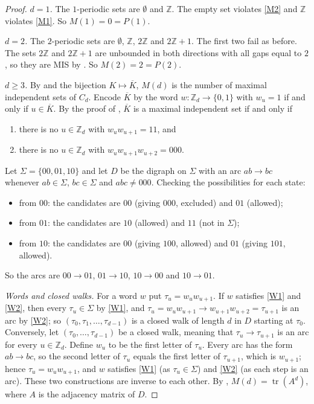 \documentclass[11pt]{article}
\theoremstyle{plain}
\theoremstyle{definition}
\theoremstyle{remark}
\newcommand{\Z}{\mathbb{Z}}
\newcommand{\Per}{P}
\DeclareMathOperator{\tr}{tr}
\begin{document}
\begin{proof}
\emph{$d = 1$.} The $1$-periodic sets are $\emptyset$ and $\Z$. The empty set violates
\ref{M2} and $\Z$ violates \ref{M1}. So $M(1) = 0 = \Per(1)$.

\emph{$d = 2$.} The $2$-periodic sets are $\emptyset$, $\Z$, $2\Z$ and $2\Z + 1$. The first
two fail as before. The sets $2\Z$ and $2\Z+1$ are unbounded in both directions with all gaps
equal to $2$, so they are MIS by . So $M(2) = 2 = \Per(2)$.

\emph{$d \ge 3$.} By  and the bijection $K \mapsto \overline{K}$,
$M(d)$ is the number of maximal independent sets of $C_d$. Encode $\overline{K}$ by the word
$w : \Z_d \to \{0,1\}$ with $w_u = 1$ if and only if $u \in \overline{K}$. By the proof of
, $\overline{K}$ is a maximal independent set if and only if
\begin{enumerate}[label=(W\arabic*)]
  \item\label{W1} there is no $u \in \Z_d$ with $w_u w_{u+1} = 11$, and
  \item\label{W2} there is no $u \in \Z_d$ with $w_u w_{u+1} w_{u+2} = 000$.
\end{enumerate}
Let $\Sigma = \{00, 01, 10\}$ and let $D$ be the digraph on $\Sigma$ with an arc
$ab \to bc$ whenever $ab \in \Sigma$, $bc \in \Sigma$ and $abc \ne 000$. Checking the
possibilities for each state:
\begin{itemize}
  \item from $00$: the candidates are $00$ (giving $000$, excluded) and $01$ (allowed);
  \item from $01$: the candidates are $10$ (allowed) and $11$ (not in $\Sigma$);
  \item from $10$: the candidates are $00$ (giving $100$, allowed) and $01$ (giving $101$,
        allowed).
\end{itemize}
So the arcs are $00 \to 01$, $01 \to 10$, $10 \to 00$ and $10 \to 01$.

\emph{Words and closed walks.} For a word $w$ put $\tau_u = w_u w_{u+1}$. If $w$ satisfies
\ref{W1} and \ref{W2}, then every $\tau_u \in \Sigma$ by \ref{W1}, and
$\tau_u = w_u w_{u+1} \to w_{u+1} w_{u+2} = \tau_{u+1}$ is an arc by \ref{W2}; so
$(\tau_0, \tau_1, \dots, \tau_{d-1})$ is a closed walk of length $d$ in $D$ starting at
$\tau_0$. Conversely, let $(\tau_0, \dots, \tau_{d-1})$ be a closed walk, meaning that
$\tau_u \to \tau_{u+1}$ is an arc for every $u \in \Z_d$. Define $w_u$ to be the first letter
of $\tau_u$. Every arc has the form $ab \to bc$, so the second letter of $\tau_u$ equals the
first letter of $\tau_{u+1}$, which is $w_{u+1}$; hence $\tau_u = w_u w_{u+1}$, and $w$
satisfies \ref{W1} (as $\tau_u \in \Sigma$) and \ref{W2} (as each step is an arc). These two
constructions are inverse to each other. By ,
$M(d) = \tr(A^d)$, where $A$ is the adjacency matrix of $D$.


\end{proof}
\end{document}

